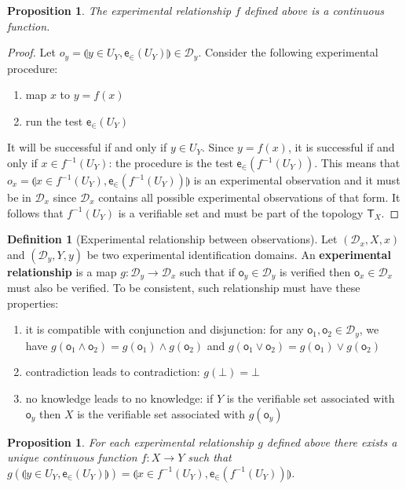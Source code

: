 \documentclass[review]{elsarticle}
\theoremstyle{plain}%
\newtheorem{prop}[thm]{Proposition}
\theoremstyle{definition}
\newtheorem{defn}{Definition}[section]
\theoremstyle{remark}
\begin{document}
\begin{prop}
	The experimental relationship $f$ defined above is a continuous function.
\end{prop}
\begin{proof}
Let $o_y = \llparenthesis y\in U_Y,\mathsf{e}_{\in}(U_Y)\rrparenthesis \in \mathcal{D}_y$.  Consider the following experimental procedure:
\begin{enumerate}
	\item map $x$ to $y=f(x)$
	\item run the test $\mathsf{e}_{\in}(U_Y)$
\end{enumerate}
It will be successful if and only if $y \in U_Y$. Since $y=f(x)$, it is successful if and only if $x \in f^{-1}(U_Y)$: the procedure is the test $\mathsf{e}_{\in}(f^{-1}(U_Y))$. This means that $o_x = \llparenthesis x \in f^{-1}(U_Y),\mathsf{e}_{\in}(f^{-1}(U_Y))\rrparenthesis$ is an experimental observation and it must be in $\mathcal{D}_x$ since $\mathcal{D}_x$ contains all possible experimental observations of that form. It follows that $f^{-1}(U_Y)$ is a verifiable set and must be part of the topology $\mathsf{T}_X$.
\end{proof}

\begin{defn}[Experimental relationship between observations]
	Let $(\mathcal{D}_x, X, x)$ and $(\mathcal{D}_y, Y, y)$ be two experimental identification domains. An \textbf{experimental relationship} is a map $g : \mathcal{D}_y \rightarrow \mathcal{D}_x$ such that if $\mathsf{o}_y \in \mathcal{D}_y$ is verified then $\mathsf{o}_x \in \mathcal{D}_x$ must also be verified. To be consistent, such relationship must have these properties:
	\begin{enumerate}
	\item it is compatible with conjunction and disjunction: for any $\mathsf{o}_1, \mathsf{o}_2 \in \mathcal{D}_y$, we have $g(\mathsf{o}_1 \wedge \mathsf{o}_2)=g(\mathsf{o}_1)\wedge g(\mathsf{o}_2)$ and $g(\mathsf{o}_1 \vee \mathsf{o}_2)=g(\mathsf{o}_1)\vee g(\mathsf{o}_2)$
	\item contradiction leads to contradiction: $g(\bot) = \bot$
	\item no knowledge leads to no knowledge: if $Y$ is the verifiable set associated with $\mathsf{o}_y$ then $X$ is the verifiable set associated with  $g(\mathsf{o}_y)$
	\end{enumerate}
\end{defn}

\begin{prop}
	For each experimental relationship $g$ defined above there exists a unique continuous function $f: X \rightarrow Y$ such that $g(\llparenthesis y\in U_Y,\mathsf{e}_{\in}(U_Y)\rrparenthesis) = \llparenthesis x\in f^{-1}(U_Y),\mathsf{e}_{\in}(f^{-1}(U_Y))\rrparenthesis$.
\end{prop}
\end{document}
